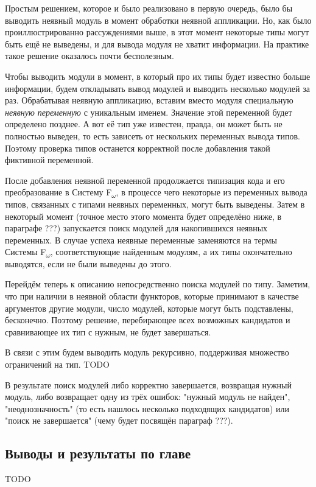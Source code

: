 \documentclass[../diploma.tex]{subfiles}
\begin{document}
Простым решением, которое и было реализовано в первую очередь, было бы выводить неявный модуль в момент обработки неявной аппликации. Но, как было проиллюстрированно рассуждениями выше, в этот момент некоторые типы могут быть ещё не выведены, и для вывода модуля не хватит информации. На практике такое решение оказалось почти бесполезным.

Чтобы выводить модули в момент, в который про их типы будет известно больше информации, будем откладывать вывод модулей и выводить несколько модулей за раз. Обрабатывая неявную аппликацию, вставим вместо модуля специальную \textit{неявную переменную} с уникальным именем. Значение этой переменной будет определено позднее. А вот её тип уже известен, правда, он может быть не полностью выведен, то есть зависеть от нескольких переменных вывода типов. Поэтому проверка типов останется корректной после добавления такой фиктивной переменной. 

После добавления неявной переменной продолжается типизация кода и его преобразование в Систему F\textsubscript{$\omega$}, в процессе чего некоторые из переменных вывода типов, связанных с типами неявных переменных, могут быть выведены. Затем в некоторый момент (точное место этого момента будет определёно ниже, в параграфе ???) запускается поиск модулей для накопившихся неявных переменных. В случае успеха неявные переменные заменяются на термы Системы F\textsubscript{$\omega$}, соответствующие найденным модулям, а их типы окончательно выводятся, если не были выведены до этого.

Перейдём теперь к описанию непосредственно поиска модулей по типу. Заметим, что при наличии в неявной области функторов, которые принимают в качестве аргументов другие модули, число модулей, которые могут быть подставлены, бесконечно. Поэтому решение, перебирающее всех возможных кандидатов и сравнивающее их тип с нужным, не будет завершаться.

В связи с этим будем выводить модуль рекурсивно, поддерживая множество ограничений на тип. TODO

В результате поиск модулей либо корректно завершается, возвращая нужный модуль, либо возвращает одну из трёх ошибок: "нужный модуль не найден", "неоднозначность" (то есть нашлось несколько подходящих кандидатов) или "поиск не завершается" (чему будет посвящён параграф ???).

\subsection{Выводы и результаты по главе}

TODO
\end{document}
